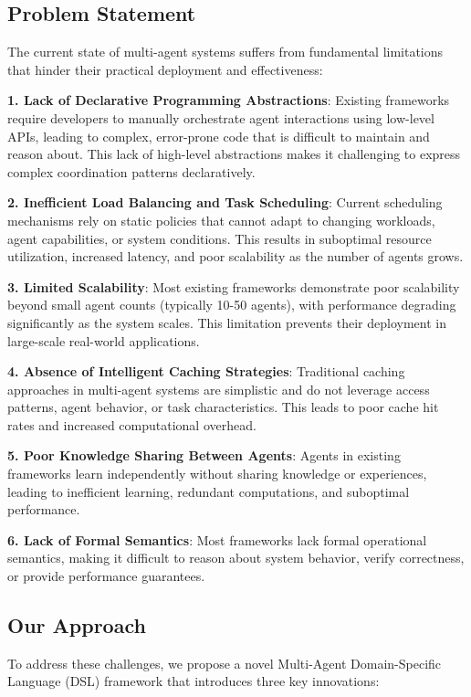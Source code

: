 \documentclass[conference]{IEEEtran}
\begin{document}
\subsection{Problem Statement}

The current state of multi-agent systems suffers from fundamental limitations that hinder their practical deployment and effectiveness:

\textbf{1. Lack of Declarative Programming Abstractions}: Existing frameworks require developers to manually orchestrate agent interactions using low-level APIs, leading to complex, error-prone code that is difficult to maintain and reason about. This lack of high-level abstractions makes it challenging to express complex coordination patterns declaratively.

\textbf{2. Inefficient Load Balancing and Task Scheduling}: Current scheduling mechanisms rely on static policies that cannot adapt to changing workloads, agent capabilities, or system conditions. This results in suboptimal resource utilization, increased latency, and poor scalability as the number of agents grows.

\textbf{3. Limited Scalability}: Most existing frameworks demonstrate poor scalability beyond small agent counts (typically 10-50 agents), with performance degrading significantly as the system scales. This limitation prevents their deployment in large-scale real-world applications.

\textbf{4. Absence of Intelligent Caching Strategies}: Traditional caching approaches in multi-agent systems are simplistic and do not leverage access patterns, agent behavior, or task characteristics. This leads to poor cache hit rates and increased computational overhead.

\textbf{5. Poor Knowledge Sharing Between Agents}: Agents in existing frameworks learn independently without sharing knowledge or experiences, leading to inefficient learning, redundant computations, and suboptimal performance.

\textbf{6. Lack of Formal Semantics}: Most frameworks lack formal operational semantics, making it difficult to reason about system behavior, verify correctness, or provide performance guarantees.

\subsection{Our Approach}

To address these challenges, we propose a novel Multi-Agent Domain-Specific Language (DSL) framework that introduces three key innovations:
\end{document}
